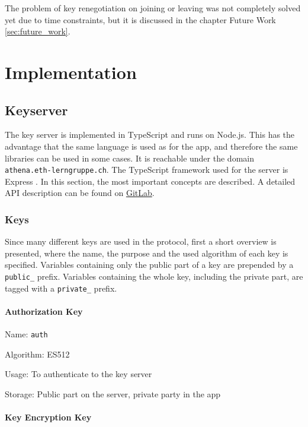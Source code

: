 \documentclass[a4paper, oneside]{discothesis}
\begin{document}
The problem of key renegotiation on joining or leaving was not completely solved yet due to time constraints, but it is discussed in the chapter Future Work \ref{sec:future_work}.


\chapter{Implementation}




\section{Keyserver}

The key server is implemented in TypeScript and runs on Node.js. This has the advantage that the same language is used as for the app, and therefore the same libraries can be used in some cases. It is reachable under the domain \texttt{athena.eth-lerngruppe.ch}. The TypeScript framework used for the server is Express \cite{Express}. In this section, the most important concepts are described. A detailed API description can be found on  \href{https://gitlab.ethz.ch/disco-students/fs21/zarron_encrypted_chat/-/blob/1.0/Keyserver/API.md}{GitLab}.

\subsection{Keys}

\label{sec:keys}

Since many different keys are used in the protocol, first a short overview is presented, where the name, the purpose and the used algorithm of each key is specified. Variables containing only the public part of a key are prepended by a \texttt{public\_} prefix. Variables containing the whole key, including the private part, are tagged with a \texttt{private\_} prefix.

\subsubsection{Authorization Key}

Name: \texttt{auth}

\noindent
Algorithm: ES512

\noindent
Usage: To authenticate to the key server

\noindent
Storage: Public part on the server, private party in the app

\subsubsection{Key Encryption Key}
\end{document}
